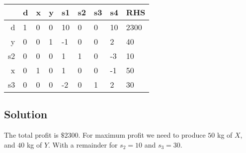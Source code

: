 \documentclass[11pt]{article}
\begin{document}
    \begin{tabular}{r|llllllll}
  & d & x & y & s1 & s2 & s3 & s4 & RHS\\
\hline
	d & 1    & 0    & 0    & 10   & 0    & 0    & 10   & 2300\\
	y & 0    & 0    & 1    & -1   & 0    & 0    &  2   &   40\\
	s2 & 0    & 0    & 0    &  1   & 1    & 0    & -3   &   10\\
	x & 0    & 1    & 0    &  1   & 0    & 0    & -1   &   50\\
	s3 & 0    & 0    & 0    & -2   & 0    & 1    &  2   &   30\\
\end{tabular}


    
    \hypertarget{solution}{%
\subsection{Solution}\label{solution}}

The total profit is \(\$2300\). For maximum profit we need to produce
\(50\) kg of \(X\), and \(40\) kg of \(Y\). With a remainder for
\(s_2=10\) and \(s_3=30\).


    
    
    
    
\end{document}
